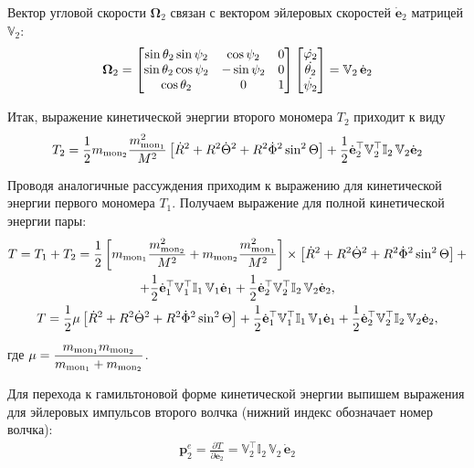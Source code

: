 \documentclass[14pt]{extarticle}
\newcommand{\mmf}{m_{\textup{mon}_1}}
\newcommand{\mms}{m_{\textup{mon}_2}}
\newcommand{\dveulerf}{\dot{\mathbf{e}}_1}
\newcommand{\dveulers}{\dot{\mathbf{e}}_2}
\newcommand{\dR}{\dot{R}}
\newcommand{\dTheta}{\dot{\Theta}}
\newcommand{\dPhi}{\dot{\Phi}}
\newcommand{\Omt}{\boldsymbol{\Omega}_2}
\newcommand{\bbVf}{\mathbb{V}_1}
\newcommand{\bbVs}{\mathbb{V}_2}
\newcommand{\bbIf}{\mathbb{I}_1 \,}
\newcommand{\bbIt}{\mathbb{I}_2 \,}
\newcommand{\pes}{\mathbf{p}_2^e}
\newcommand{\lsq}{\left[}
\newcommand{\rsq}{\right]}
\begin{document}
Вектор угловой скорости $\Omt$ связан с вектором эйлеровых скоростей $\dveulers$ матрицей $\bbVs$:
\begin{gather}
	\Omt = \begin{bmatrix}
		\sin \theta_2 \sin \psi_2 &  \cos \psi_2 & 0 \\
		\sin \theta_2 \cos \psi_2 & - \sin \psi_2 & 0 \\
		\cos \theta_2 & 0 & 1
	\end{bmatrix} 
	\begin{bmatrix}
		\dot{\varphi_2} \\
		\dot{\theta_2} \\
		\dot {\psi_2} 
	\end{bmatrix} =
	\bbVs \, \dveulers \notag
\end{gather}

Итак, выражение кинетической энергии второго мономера $T_2$ приходит к виду
\begin{gather}
		T_2 = \frac{1}{2} \mms \frac{\mmf^2}{M^2} \lsq \dR^2 + R^2 \dTheta^2 + R^2 \dPhi^2 \sin^2 \Theta \rsq + \frac{1}{2} \dveulers^\top \bbVs^\top \bbIt \bbVs \dveulers
\end{gather}

Проводя аналогичные рассуждения приходим к выражению для кинетической энергии первого мономера $T_1$. Получаем выражение для полной кинетической энергии пары:
\begin{gather}
		T = T_1 + T_2 = \frac{1}{2} \lsq \mmf \frac{\mms^2}{M^2} + \mms \frac{\mmf^2}{M^2} \rsq \times \lsq \dR^2 + R^2 \dTheta^2 + R^2 \dPhi^2 \sin^2 \Theta \rsq + \notag \\ + \frac{1}{2} \dveulerf^\top \bbVf^\top \bbIf \bbVf \dveulerf + \frac{1}{2} \dveulers^\top \bbVs^\top \bbIt \bbVs \dveulers,  \\
		T = \frac{1}{2} \mu \lsq \dR^2 + R^2 \dTheta^2 + R^2 \dPhi^2 \sin^2 \Theta \rsq + \frac{1}{2} \dveulerf^\top \bbVf^\top \bbIf \bbVf \dveulerf + \frac{1}{2} \dveulers^\top \bbVs^\top \bbIt \bbVs \dveulers, \label{total}
\end{gather}

где $\displaystyle \mu = \frac{\mmf \mms}{\mmf + \mms}$.

Для перехода к гамильтоновой форме кинетической энергии выпишем выражения для эйлеровых импульсов второго волчка (нижний индекс обозначает номер волчка):
\begin{gather}
	\pes = \frac{\partial T}{\partial \dveulers} = \bbVs^\top \bbIt \bbVs \, \dveulers 
\end{gather}
\end{document}
